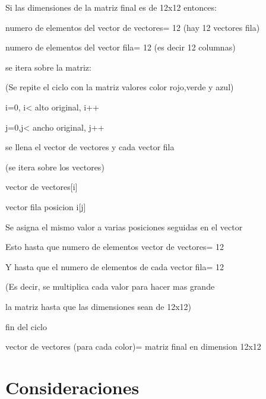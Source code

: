 \documentclass{article}
\begin{document}
\hspace{0.5cm}Si las dimensiones de la matriz final es de 12x12 entonces:

\hspace{0.5cm}numero de elementos del vector de vectores= 12 (hay 12 vectores fila)

\hspace{0.5cm}numero de elementos del vector fila= 12 (es decir 12 columnas)

\hspace{0.5cm}se itera sobre la matriz:

\hspace{0.5cm}(Se repite el ciclo con la matriz valores color rojo,verde y azul)

\hspace{0.5cm}i=0, i< alto original, i++

\hspace{1cm}j=0,j< ancho original, j++

\hspace{1cm}se llena el vector de vectores y cada vector fila 

\hspace{1cm}(se itera sobre los vectores)

\hspace{1.5cm}vector de vectores[i]

\hspace{1.5cm}vector fila posicion i[j]

\hspace{1cm}Se asigna el mismo valor a varias posiciones seguidas en el vector

\hspace{1cm}Esto hasta que numero de elementos vector de vectores= 12

\hspace{1cm}Y hasta que el numero de elementos de cada vector fila= 12

\hspace{1cm}(Es decir, se multiplica cada valor para hacer mas grande

\hspace{1cm}la matriz hasta que las dimensiones sean de 12x12)

\hspace{0.5cm}fin del ciclo
    
vector de vectores (para cada color)= matriz final en dimension 12x12

\section{Consideraciones}\label{Consideraciones}
\end{document}

